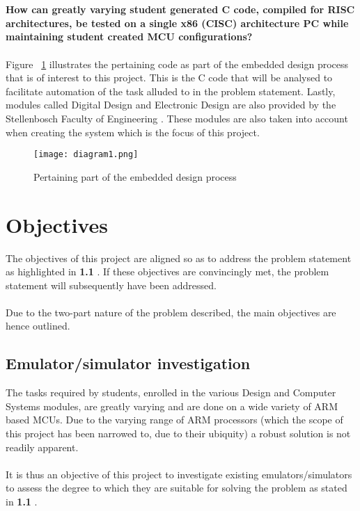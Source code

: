\\\\
\textbf{How can greatly varying student generated C code, compiled for RISC architectures, be tested on a single x86 (CISC) architecture PC while maintaining student created MCU configurations?}
\\\\
Figure ~\ref{fig:introDia} illustrates the pertaining code as part of the embedded design process that is of interest to this project. This is the C code that will be analysed to facilitate automation of the task alluded to in the problem statement. Lastly, modules called Digital Design and Electronic Design are also provided by the Stellenbosch Faculty of Engineering \cite{Stelle2020}. These modules are also taken into account when creating the system which is the focus of this project.
\begin{figure}[H]
\begin{center}
\texttt{[image: diagram1.png]}
\caption{Pertaining part of the embedded design process}
\label{fig:introDia}
\end{center}
\end{figure}
\section{Objectives}
\label{obj}
The objectives of this project are aligned so as to address the problem statement as highlighted in \textbf{1.1 }. If these objectives are convincingly  met, the problem statement will subsequently have been addressed.
\\\\
Due to the two-part nature of the problem described, the main objectives are hence outlined.
\subsection{Emulator/simulator investigation}
\label{emInvestObj}
The tasks required by students, enrolled in the various Design and Computer Systems modules, are greatly varying and are done on a wide variety of ARM based MCUs. Due to the varying range of ARM processors (which the scope of this project has been narrowed to, due to their ubiquity) a robust solution is not readily apparent.
\\\\
It is thus an objective of this project to investigate existing emulators/simulators to assess the degree to which they are suitable for solving the problem as stated in \textbf{1.1 }.
